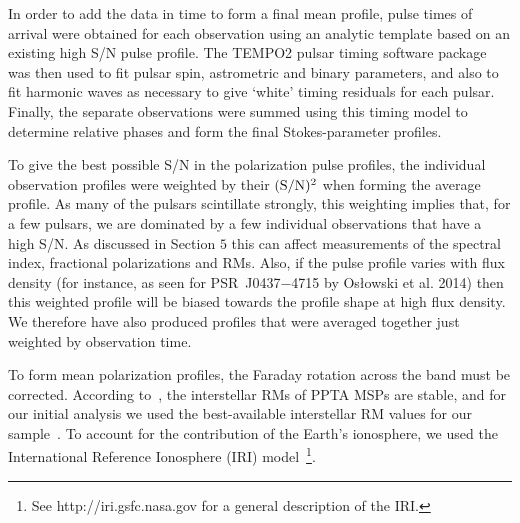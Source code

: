 \documentclass[useAMS,usenatbib]{mn2e}
\begin{document}
In order to add the data in time to form a final mean profile, pulse times of arrival 
were obtained for each observation using an analytic template based on an existing 
high S/N pulse profile. The TEMPO2 pulsar timing software package~\citep{Hobbs06}  
was then used to fit pulsar spin, astrometric and binary parameters, and also to fit 
harmonic waves as necessary to give ‘white’ timing residuals for each pulsar. Finally, 
the separate observations were summed using this timing model to determine relative 
phases and form the final Stokes-parameter profiles. 
%

To give the best possible S/N in the polarization pulse profiles, the individual 
observation profiles were weighted by their $(\rm{S/N})^2$ when forming the average profile. 
%
As many of the pulsars scintillate strongly, this weighting implies that, for a few pulsars, 
we are dominated by a few individual observations that have a high S/N. As discussed in 
Section $5$ this can affect measurements of the spectral index, fractional polarizations and 
RMs. Also, if the pulse profile varies with flux density (for instance, 
as seen for PSR~J0437$-$4715 by Os{\l}owski et al. 2014) then this weighted profile will be 
biased towards the profile shape at high flux density. We therefore have also produced 
profiles that were averaged together just weighted by observation time. 

To form mean polarization profiles, the Faraday rotation across the band must be 
corrected. 
%
According to~\citet{Yan11b}, the interstellar RMs of PPTA MSPs are stable, and for our initial analysis we 
used the best-available interstellar RM values for our sample~\citep{Keith11,Yan11,Keith12,Burgay13}.
%
To account for the contribution of the Earth's ionosphere, we used the International 
Reference Ionosphere (IRI) model~\footnote{See http://iri.gsfc.nasa.gov for a general description
of the IRI.}. 
%
%
\end{document}
